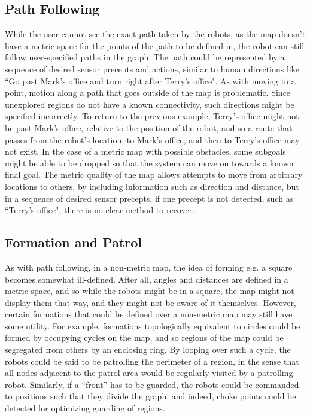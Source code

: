 \subsection{Path Following}

While the user cannot see the exact path taken by the robots, as the map doesn't have a metric space for the points of the path to be defined in, the robot can still follow user-specified paths in the graph.
The path could be represented by a sequence of desired sensor precepts and actions, similar to human directions like ``Go past Mark's office and turn right after Terry's office".
As with moving to a point, motion along a path that goes outside of the map is problematic.
Since unexplored regions do not have a known connectivity, such directions might be specified incorrectly. 
To return to the previous example, Terry's office might not be past Mark's office, relative to the position of the robot, and so a route that passes from the robot's location, to Mark's office, and then to Terry's office may not exist.  
In the case of a metric map with possible obstacles, some subgoals might be able to be dropped so that the system can move on towards a known final goal. 
The metric quality of the map allows attempts to move from arbitrary locations to others, by including information such as direction and distance, but in a sequence of desired sensor precepts, if one precept is not detected, such as ``Terry's office", there is no clear method to recover. 

\subsection{Formation and Patrol}

As with path following, in a non-metric map, the idea of forming e.g. a square becomes somewhat ill-defined. 
After all, angles and distances are defined in a metric space, and so while the robots might be in a square, the map might not display them that way, and they might not be aware of it themselves. 
However, certain formations that could be defined over a non-metric map may still have some utility. 
For example, formations topologically equivalent to circles could be formed by occupying cycles on the map, and so regions of the map could be segregated from others by an enclosing ring. 
By looping over such a cycle, the robots could be said to be patrolling the perimeter of a region, in the sense that all nodes adjacent to the patrol area would be regularly visited by a patrolling robot. Similarly, if a ``front'' has to be guarded, the robots could be commanded to positions such that they divide the graph, and indeed, choke points could be detected for optimizing guarding of regions.

